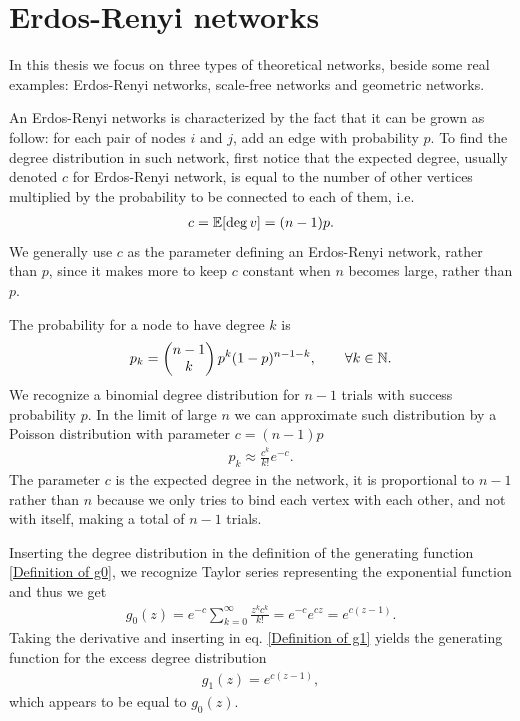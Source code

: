 \documentclass[
11pt, %
english, %
singlespacing, %
nolistspacing, %
liststotoc, %
headsepline, %
]{MastersDoctoralThesis} %
\begin{document}
\section{Erdos-Renyi networks}

In this thesis we focus on three types of theoretical networks, beside some real examples: Erdos-Renyi networks, scale-free networks and geometric networks.

An Erdos-Renyi networks is characterized by the fact that it can be grown as follow: for each pair of nodes $i$ and $j$, add an edge with probability $p$. To find the degree distribution in such network, first notice that the expected degree, usually denoted $c$ for Erdos-Renyi network, is equal to the number of other vertices multiplied by the probability to be connected to each of them, i.e.
\begin{align}
	c = \mathbb{E}\!\left[ \deg{v} \right] = (n - 1) p.
\end{align}
We generally use $c$ as the parameter defining an Erdos-Renyi network, rather than $p$, since it makes more to keep $c$ constant when $n$ becomes large, rather than $p$. 

The probability for a node to have degree $k$ is
\begin{align}
	p_k = \begin{pmatrix} n-1 \\ k \end{pmatrix} p^k (1 - p)^{n - 1 - k}, \qquad \forall k \in \mathbb{N}. \label{Poisson degree distribution}
\end{align}
We recognize a binomial degree distribution for $n-1$ trials with success probability $p$. In the limit of large $n$ we can approximate such distribution by a Poisson distribution with parameter $c = (n - 1) p$
\begin{align}
	p_k \approx \frac{c^k}{k!} e^{-c}.  \label{pk for Erdos-Renyi}
\end{align}
The parameter $c$ is the expected degree in the network, it is proportional to $n - 1$ rather than $n$ because we only tries to bind each vertex with each other, and not with itself, making a total of $n-1$ trials.

Inserting the degree distribution in the definition of the generating function \eqref{Definition of g0}, we recognize Taylor series representing the exponential function and thus we get
\begin{align}
	g_0(z) = e^{-c} \sum_{k = 0}^\infty \frac{z^k c^k}{k!} = e^{-c} e^{c z} = e^{c(z - 1)}. \label{g0 for ER networks}
\end{align}
Taking the derivative and inserting in eq. \eqref{Definition of g1} yields the generating function for the excess degree distribution
\begin{align} 
	g_1(z) = e^{c(z - 1)},
\end{align}
which appears to be equal to $g_0(z)$.
\end{document}
